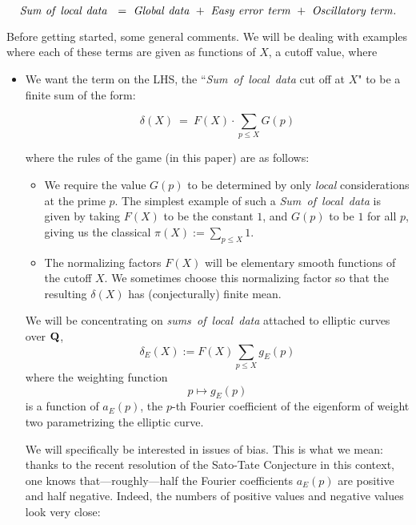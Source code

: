 \documentclass[11pt]{article}
\theoremstyle{plain}
\theoremstyle{definition}
\numberwithin{equation}{section}
\numberwithin{figure}{section}
\numberwithin{table}{section}
\def\Q{\bf{Q}}
\begin{document}
{\Large $${\rm{\it Sum\ of\ local\ data\  }}  \ = \  {\rm{\it Global\ data}}\ +\  {\rm{\it  Easy\ error\ term}}\ +\  {\rm{\it  Oscillatory\ term}}.$$ }

Before getting started, some general comments. We will be dealing with examples where each of these terms are given as functions of $X$, a cutoff value, where

\begin{itemize}\item We want the term on the LHS,   the {``{\it Sum\ of\ local\ data} cut off at $X$"} to be  a finite sum of the form:

  $$\delta(X) \ = \ F(X)\cdot \sum_{p\le X}G(p)$$

  where the rules of the game (in this paper) are as follows:

  \begin{itemize} \item We require the value $G(p)$ to be determined by only {\it local }considerations at the prime $p$.
The simplest example of such a {\it Sum\ of\ local\ data}  is given by taking $F(X)$ to be the constant $1$, and  $G(p)$ to be  $1$ for all $p$, giving us the classical $\pi(X):=\sum_{p\le X}1$. \item The normalizing factors $F(X)$ will be elementary smooth functions of the cutoff $X$. We sometimes choose this normalizing factor so that the  resulting  $\delta(X)$ has (conjecturally) finite mean.\end{itemize}

We will be concentrating on  {\it sums\ of\ local\ data}  attached to elliptic curves over ${\Q}$,   $$\delta_E(X):=F(X)\sum_{p\le X}g_E(p)$$ where the weighting function $$p \mapsto g_E(p)$$   is a function of $a_E(p)$, the $p$-th Fourier coefficient of the eigenform of weight two parametrizing the elliptic curve.

  We will specifically be interested in  issues of bias. This is what we mean: thanks to the recent resolution of the Sato-Tate Conjecture in this context, one knows that---roughly---half the Fourier coefficients  $a_E(p)$ are positive and half negative.  Indeed, the numbers of positive values and negative values look very close:
\vskip20pt


\end{itemize}
\end{document}
